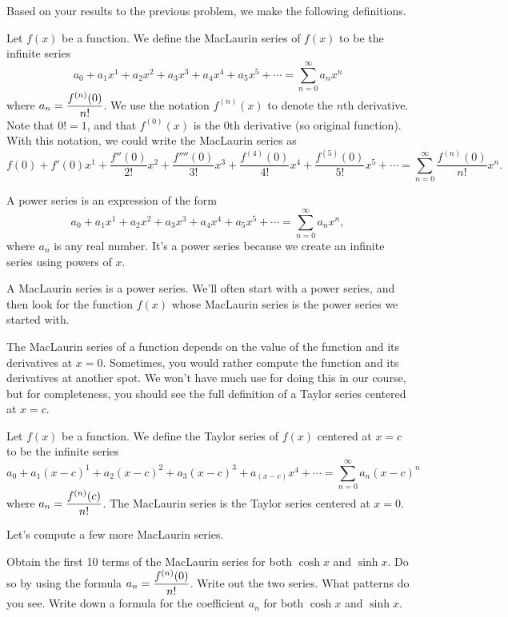 Based on your results to the previous problem, we make the following definitions.
\begin{definition}
Let $f(x)$ be a function.  We define the MacLaurin series of $f(x)$ to be the infinite series 
$$a_0+a_1x^1+a_2x^2+a_3x^3+a_4x^4 + a_5x^5 + \cdots = \sum_{n=0}^\infty a_n x^n$$
where $\displaystyle a_n=\frac{f^{(n)}(0)}{n!}$. We use the notation $f^{(n)}(x)$ to denote the $n$th derivative. Note that $0!=1$, and that $f^{(0)}(x)$ is the 0th derivative (so original function).  With this notation, we could write the MacLaurin series as 
$$f(0)+f'(0)x^1+\frac{f''(0)}{2!}x^2+\frac{f''''(0)}{3!}x^3+\frac{f^{(4)}(0)}{4!}x^4 + \frac{f^{(5)}(0)}{5!}x^5 + \cdots = \sum_{n=0}^\infty \frac{f^{(n)}(0)}{n!} x^n.$$  
\end{definition}
\begin{definition}
A power series is an expression of the form
$$a_0+a_1x^1+a_2x^2+a_3x^3+a_4x^4 + a_5x^5 + \cdots = \sum_{n=0}^\infty a_n x^n,$$
where $a_n$ is any real number. It's a power series because we create an infinite series using powers of $x$. 
\end{definition}
A MacLaurin series is a power series.  We'll often start with a power series, and then look for the function $f(x)$ whose MacLaurin series is the power series we started with. 

The MacLaurin series of a function depends on the value of the function and its derivatives at $x=0$.  Sometimes, you would rather compute the function and its derivatives at another spot.  We won't have much use for doing this in our course, but for completeness, you should see the full definition of a Taylor series centered at $x=c$. 

\begin{definition}[Taylor Series centered at $x=c$]
 Let $f(x)$ be a function.  We define the Taylor series of $f(x)$ centered at $x=c$ to be the infinite series 
$$a_0+a_1(x-c)^1+a_2(x-c)^2+a_3(x-c)^3+a_(x-c)x^4 + \cdots = \sum_{n=0}^\infty a_n (x-c)^n$$
where $\displaystyle a_n=\frac{f^{(n)}(c)}{n!}$. The MacLaurin series is the Taylor series centered at $x=0$.
\end{definition}



Let's compute a few more MacLaurin series.

\begin{problem}
 Obtain the first 10 terms of the MacLaurin series for both $\cosh x$ and $\sinh x$.  Do so by using the formula $\displaystyle a_n=\frac{f^{(n)}(0)}{n!}$.  Write out the two series.  What patterns do you see.  Write down a formula for the coefficient $a_n$ for both $\cosh x$ and $\sinh x$. 
\end{problem}

